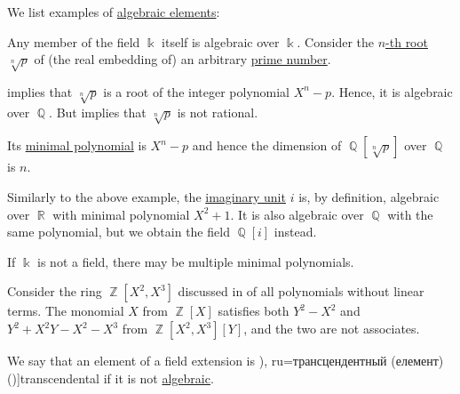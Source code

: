 \begin{example}\label{ex:def:algebraic_element}
  We list examples of \hyperref[def:algebraic_element]{algebraic elements}:
  \begin{thmenum}
     Any member of the field \( \Bbbk \) itself is algebraic over \( \Bbbk \).
     Consider the \hyperref[def:nth_root]{\( n \)-th root} \( \sqrt[n]{ p } \) of (the real embedding of) an arbitrary \hyperref[def:prime_number]{prime number}.

     implies that \( \sqrt[n]{ p } \) is a root of the integer polynomial \( X^n - p \). Hence, it is algebraic over \( \BbbQ \). But  implies that \( \sqrt[n]{ p } \) is not rational.

    Its \hyperref[def:algebraic_element/quotient]{minimal polynomial} is \( X^n - p \) and hence the dimension of \( \BbbQ[\sqrt[n]{ p }] \) over \( \BbbQ \) is \( n \).

     Similarly to the above example, the \hyperref[def:complex_numbers]{imaginary unit} \( i \) is, by definition, algebraic over \( \BbbR \) with minimal polynomial \( X^2 + 1 \). It is also algebraic over \( \BbbQ \) with the same polynomial, but we obtain the field \( \BbbQ[i] \) instead.

     If \( \Bbbk \) is not a field, there may be multiple minimal polynomials.

    Consider the ring \( \BbbZ[X^2, X^3] \) discussed in  of all polynomials without linear terms. The monomial \( X \) from \( \BbbZ[X] \) satisfies both \( Y^2 - X^2 \) and \( Y^2 + X^2Y - X^2 - X^3 \) from \( \BbbZ[X^2, X^3][Y] \), and the two are not associates.
  \end{thmenum}
\end{example}

\begin{definition}\label{def:transcendental_element}
  We say that an element of a field extension is \term[bg=трансцендентен (елемент) (\cite[135]{ГеновМиховскиМоллов1991}), ru=трансцендентный (елемент) (\cite[407]{Винберг2014})]{transcendental} if it is not \hyperref[def:algebraic_element]{algebraic}.
\end{definition}

